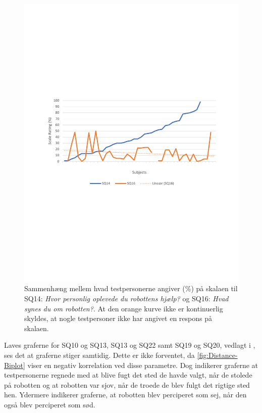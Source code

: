 \begin{figure}[H]
	\centering
	\includegraphics[width=\textwidth]{Figure/Korrelationsgrafer/SQ14+SQ16}
	\caption{Sammenhæng mellem hvad testpersonerne angiver (\%) på skalaen til SQ14: \textit{Hvor personlig oplevede du robottens hjælp?} og SQ16: \textit{Hvad synes du om robotten?}. At den orange kurve ikke er kontinuerlig skyldes, at nogle testpersoner ikke har angivet en respons på skalaen.}
	\label{fig:SammenligningSQ14SQ16}
\end{figure}
\noindent
%
Laves graferne for SQ10 og SQ13, SQ13 og SQ22 samt SQ19 og SQ20, vedlagt i , ses det at graferne stiger samtidig. Dette er ikke forventet, da \autoref{fig:Distance-Biplot} viser en negativ korrelation ved disse parametre. Dog indikerer graferne at testpersonerne regnede med at blive fugt det sted de havde valgt, når de stolede på robotten og at robotten var sjov, når de troede de blev fulgt det rigtige sted hen. Ydermere indikerer graferne, at robotten blev perciperet som sej, når den også blev perciperet som sød.

